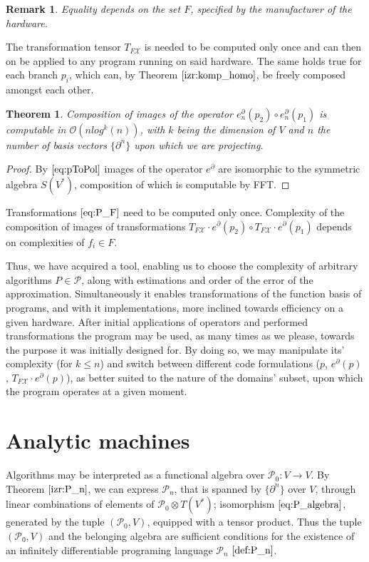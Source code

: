 \documentclass{article}
\newcommand{\X}{\mathcal{X}}
\newcommand{\dP}{\mathcal{P}}
\newcommand{\D}{\partial}
\newtheorem{izrek}{Theorem}[section]
\newtheorem{opomba}{Remark}[section]
\begin{document}
\begin{opomba}
Equality depends on the set $F$, specified by the manufacturer of the hardware.
\end{opomba}

The transformation tensor $T_{F\X}$ is needed to be computed only once and can then on be applied to any program running on said hardware. The same holds true for each branch $p_i$, which can, by Theorem $\ref{izr:komp_homo}$, be freely composed amongst each other.

\begin{izrek}
Composition of images of the operator $e_n^\D(p_2)\circ e_n^\D(p_1)$ is computable in $\mathcal{O}(nlog^k(n))$, with $k$ being the dimension of $V$ and $n$ the number of basis vectors $\{\D^n\}$ upon which we are projecting.
\end{izrek}

\begin{proof}
	By $\eqref{eq:pToPol}$ images of the operator $e^\D$ are isomorphic to the symmetric algebra $S(V^*)$, composition of which is computable by FFT.
\end{proof}

Transformations $\eqref{eq:P_F}$ need to be computed only once. Complexity of the composition of images of transformations $T_{F\X}\cdot e^\D(p_2)\circ T_{F\X}\cdot e^\D(p_1)$ depends on complexities of $f_i\in F$.

Thus, we have acquired a tool, enabling us to choose the complexity of arbitrary algorithms $P\in\dP$, along with estimations and order of the error of the approximation. Simultaneously it enables transformations of the function basis of programs, and with it implementations, more inclined towards efficiency on a given hardware. After initial applications of operators and performed transformations the program may be used, as many times as we please, towards the purpose it was initially designed for. By doing so, we may manipulate its' complexity (for $k\le n$) and switch between different code formulations ($p$, $e^\D(p)$, $T_{F\X}\cdot e^\D(p)$), as better suited to the nature of the domains' subset, upon which the program operates at a given moment.

\section{Analytic machines}
Algorithms may be interpreted as a functional algebra over $\dP_0:V\to V$.
By Theorem $\ref{izr:P_n}$, we can express $\dP_n$, that is spanned by $\{\D^n\}$ over $V$, through linear combinations of elements of $\dP_0\otimes T(V^*)$; isomorphism $\eqref{eq:P_algebra}$, generated by the tuple $(\dP_0,V)$, equipped with a tensor product. Thus the tuple  $(\dP_0,V)$ and the belonging algebra are sufficient conditions for the existence of an infinitely differentiable programing language $\dP_n$ $\eqref{def:P_n}$.
\end{document}
